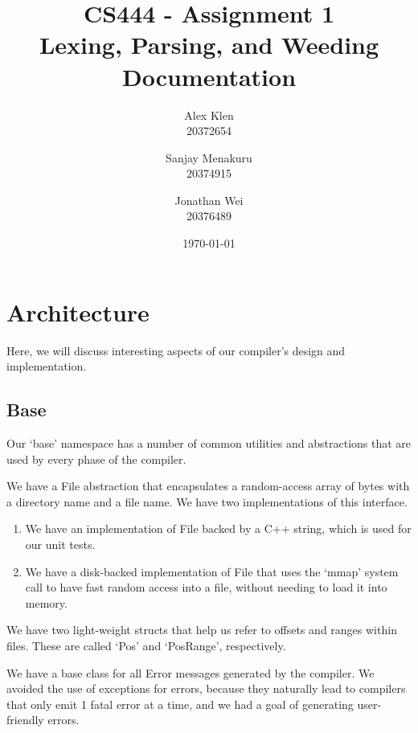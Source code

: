 \documentclass[12pt, titlepage]{article}
\newcommand{\assignmentNumber}{Assignment 1}
\newcommand{\courseName}{CS 444}
\begin{document}
\pagestyle{fancyplain}
\thispagestyle{plain}

\fancyhead{}
\fancyfoot{}
\chead{\fancyplain{}{\assignmentNumber}}
\lhead{\fancyplain{}{\courseName}}

\title{CS444 - \assignmentNumber\\Lexing, Parsing, and Weeding Documentation}
\date{\today}
\author{Alex Klen\\20372654\and Sanjay Menakuru\\20374915\and Jonathan Wei\\20376489}

\maketitle

\section{Architecture}
Here, we will discuss interesting aspects of our compiler's design and
implementation.

\subsection{Base}
Our `base' namespace has a number of common utilities and abstractions that are
used by every phase of the compiler.

We have a File abstraction that encapsulates a random-access array of bytes
with a directory name and a file name. We have two implementations of this
interface.

\begin{enumerate}
  \item
  We have an implementation of File backed by a C++ string, which is used for
  our unit tests.
  \item
  We have a disk-backed implementation of File that uses the `mmap' system
  call to have fast random access into a file, without needing to load it into
  memory.
\end{enumerate}

We have two light-weight structs that help us refer to offsets and ranges
within files. These are called `Pos' and `PosRange', respectively.

We have a base class for all Error messages generated by the compiler. We
avoided the use of exceptions for errors, because they naturally lead to
compilers that only emit 1 fatal error at a time, and we had a goal of
generating user-friendly errors.
\end{document}
